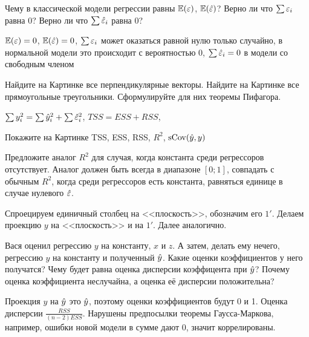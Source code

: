 \begin{problem}
Чему в классической модели регрессии равны $\mathbb{E}(\varepsilon)$, $\mathbb{E}(\hat{\varepsilon})$? Верно ли что $\sum \varepsilon_i$ равна 0? Верно ли что $\sum \hat{\varepsilon}_i$ равна 0?
\end{problem}
\begin{solution}
$\mathbb{E}(\varepsilon)=0$, $\mathbb{E}(\hat{\varepsilon})=0$, $\sum \varepsilon_i$ может оказаться равной нулю только случайно, в нормальной модели это происходит с вероятностью 0, $\sum \hat{\varepsilon}_i=0$ в модели со свободным членом
\end{solution}


\begin{problem}
Найдите на Картинке все перпендикулярные векторы. Найдите на Картинке все прямоугольные треугольники. Сформулируйте для них теоремы Пифагора.
\end{problem}

\begin{solution}
$\sum y_i^2=\sum \hat{y}_i^2+\sum \hat{\varepsilon}_i^2$, $TSS=ESS+RSS$, 
\end{solution}


\begin{problem}
Покажите на Картинке TSS, ESS, RSS, $R^2$, $\operatorname{sCov}(\hat{y},y)$
\end{problem}
\begin{solution}
\end{solution}

\begin{problem}
Предложите аналог $R^2$ для случая, когда константа среди регрессоров отсутствует. Аналог должен быть всегда в диапазоне $[0;1]$, совпадать с обычным $R^2$, когда среди регрессоров есть константа, равняться единице в случае нулевого $\hat{\varepsilon}$.
\end{problem}

\begin{solution}
Спроецируем единичный столбец на <<плоскость>>, обозначим его $1'$. Делаем проекцию $y$ на <<плоскость>> и на $1'$. Далее аналогично. 
\end{solution}


\begin{problem}
Вася оценил регрессию $y$ на константу, $x$ и $z$. А затем, делать ему нечего, регрессию $y$ на константу и полученный $\hat{y}$. Какие оценки коэффициентов у него получатся? Чему будет равна оценка дисперсии коэффицента при $\hat{y}$? Почему оценка коэффициента неслучайна, а оценка её дисперсии положительна?
\end{problem}

\begin{solution}
Проекция $y$ на $\hat{y}$ это $\hat{y}$, поэтому оценки коэффициентов будут 0 и 1. Оценка дисперсии $\frac{RSS}{(n-2)ESS}$. Нарушены предпосылки теоремы Гаусса-Маркова, например, ошибки новой модели в сумме дают 0, значит коррелированы. 
\end{solution}



